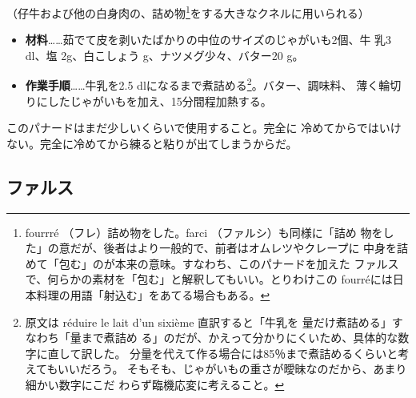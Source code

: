 \begin{recette}


（仔牛および他の白身肉の、詰め物\footnote{fourrré
  （フレ）詰め物をした。farci （ファルシ）も同様に「詰め
  物をした」の意だが、後者はより一般的で、前者はオムレツやクレープに
  中身を詰めて「包む」のが本来の意味。すなわち、このパナードを加えた
  ファルスで、何らかの素材を「包む」と解釈してもいい。とりわけこの
  fourréには日本料理の用語「射込む」をあてる場合もある。}をする大きなクネルに用いられる）

\begin{itemize}
\item
  \textbf{材料}\ldots{}\ldots{}茹でて皮を剥いたばかりの中位のサイズのじゃがいも2個、牛
  乳3 dl、塩 2g、白こしょう\undemi{} g、ナツメグ少々、バター20 g。
\item
  \textbf{作業手順}\ldots{}\ldots{}牛乳を2.5
  dlになるまで煮詰める\footnote{原文は réduire le lait d'un sixième
    直訳すると「牛乳を
    \unsixieme{}量だけ煮詰める」すなわち「\cinqsixiemes{}量まで煮詰め
    る」のだが、かえって分かりにくいため、具体的な数字に直して訳した。
    分量を代えて作る場合には85％まで煮詰めるくらいと考えてもいいだろう。
    そもそも、じゃがいもの重さが曖昧なのだから、あまり細かい数字にこだ
    わらず臨機応変に考えること。}。バター、調味料、
  薄く輪切りにしたじゃがいもを加え、15分間程加熱する。
\end{itemize}

このパナードはまだ少しいくらいで使用すること。完全に
冷めてからではいけない。完全に冷めてから練ると粘りが出てしまうからだ。
\end{recette}
\hypertarget{farces}{%
\subsection{ファルス}\label{farces}}


 

